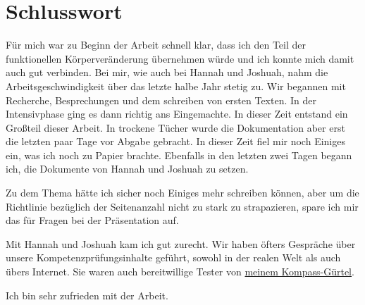 \section{Schlusswort}
Für mich war zu Beginn der Arbeit schnell klar, dass ich den Teil der funktionellen Körperveränderung
übernehmen würde und ich konnte mich damit auch gut verbinden. Bei mir, wie auch bei Hannah und
Joshuah, nahm die Arbeitsgeschwindigkeit über das letzte halbe Jahr stetig zu. Wir begannen mit
Recherche, Besprechungen und dem schreiben von ersten Texten. In der Intensivphase ging es dann
richtig ans Eingemachte. In dieser Zeit entstand ein Großteil dieser Arbeit. In trockene Tücher wurde
die Dokumentation aber erst die letzten paar Tage vor Abgabe gebracht. In dieser Zeit fiel mir noch
Einiges ein, was ich noch zu Papier brachte. Ebenfalls in den letzten zwei Tagen begann ich,
die Dokumente von Hannah und Joshuah zu setzen.

Zu dem Thema hätte ich sicher noch Einiges mehr schreiben können, aber um die Richtlinie bezüglich
der Seitenanzahl nicht zu stark zu strapazieren, spare ich mir das für Fragen bei der Präsentation
auf.

Mit Hannah und Joshuah kam ich gut zurecht. Wir haben öfters Gespräche über unsere
Kompetenzprüfungsinhalte geführt, sowohl in der realen Welt als auch übers Internet. Sie waren auch
bereitwillige Tester von \hyperref[sec:Robin:experiments:myMagnet]{meinem Kompass-Gürtel}.

Ich bin sehr zufrieden mit der Arbeit.

